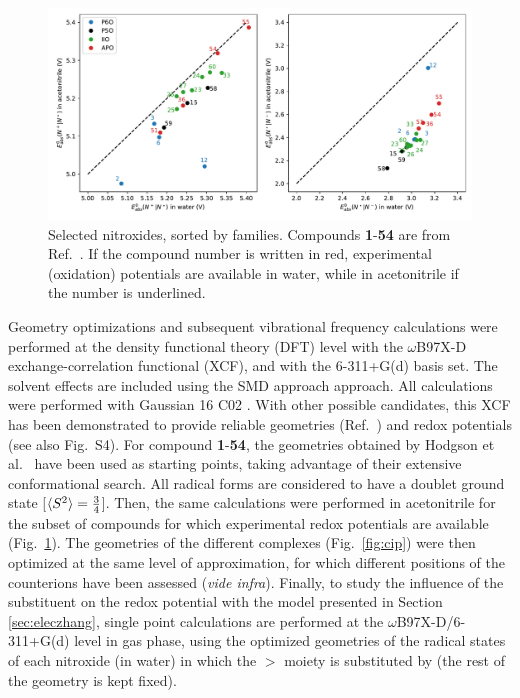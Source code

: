 \documentclass[review,preprint]{elsarticle}
\begin{document}
\begin{figure}[!p]
	\centering
	\includegraphics[width=\linewidth]{Figure7}
	\caption{Selected nitroxides, sorted by families. Compounds \textbf{1}-\textbf{54} are from Ref.~.  If the compound number is written in red, experimental (oxidation) potentials are available in water, while in acetonitrile if the number is underlined.}
	\label{fig:nitroxides}
\end{figure}

Geometry optimizations and subsequent vibrational frequency calculations were performed at the density functional theory (DFT) level with the $\omega$B97X-D exchange-correlation functional (XCF), and with the 6-311+G(d)  basis set. The solvent effects are included using the SMD approach \cite{marenichUniversalSolvationModel2009} approach. All calculations were performed with Gaussian 16 C02 \cite{g16}. With other possible candidates, this XCF has been demonstrated to  provide reliable geometries (Ref.~) and redox potentials  \cite{flores-leonarFurtherInsightsDFT2017,maierG4AccuracyDFT2020} (see also Fig.~S4).  For compound \textbf{1}-\textbf{54}, the geometries obtained by Hodgson et al.~\cite{hodgsonOneElectronOxidationReduction2007} have been used as starting points, taking advantage of their extensive conformational search. All radical forms are considered to have a doublet ground state  [$\braket{S^2}=\frac{3}{4}$]. Then, the same calculations were performed in acetonitrile for the subset of compounds for which experimental redox potentials are available (Fig.~\ref{fig:nitroxides}). The geometries of the different complexes (Fig.~\ref{fig:cip}) were then optimized at the same level of approximation, for which different positions of the counterions have been assessed (\textit{vide infra}). Finally, to study the influence of the substituent on the redox potential with the model presented in Section \ref{sec:eleczhang}, single point calculations are performed at the $\omega$B97X-D/6-311+G(d) level in gas phase, using the optimized geometries of  the radical states of each nitroxide (in water) in which the  $>$ moiety is substituted by  (the rest of the geometry is kept fixed).
\end{document}
